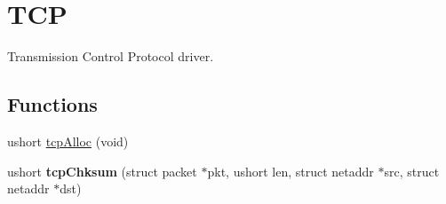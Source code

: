 \hypertarget{group__tcp}{\section{T\-C\-P}
\label{group__tcp}
}


Transmission Control Protocol driver.  


\subsection*{Functions}
\begin{DoxyCompactItemize}
\item 
ushort \hyperlink{group__tcp_gaa2153df9bbc47bfd108b8220ff1d8ab2}{tcp\-Alloc} (void)
\item 
\hypertarget{group__tcp_ga25d584036e586a90cc128af3db5d74f5}{ushort {\bfseries tcp\-Chksum} (struct packet $\ast$pkt, ushort len, struct netaddr $\ast$src, struct netaddr $\ast$dst)}\label{group__tcp_ga25d584036e586a90cc128af3db5d74f5}


\end{DoxyCompactItemize}
